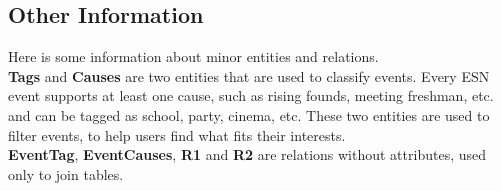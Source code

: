 \subsection{Other Information}

Here is some information about minor entities and relations.\\
\textbf{Tags} and \textbf{Causes} are two entities that are used to classify events. Every ESN event
supports at least one cause, such as rising founds, meeting freshman, etc.
and can be tagged as school, party, cinema, etc. These two entities are used to filter events, to help users find what fits their interests.\\
\textbf{EventTag}, \textbf{EventCauses}, \textbf{R1} and \textbf{R2} are relations without attributes, used
only to join tables.